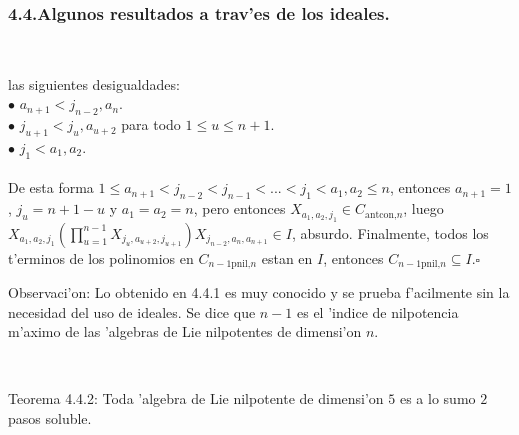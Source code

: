 \documentclass[10pt]{beamer}
\begin{document}
\begin{frame}
\frametitle{4.4.Algunos resultados a trav'es de los ideales.}\\
\begin{block}{}
las siguientes desigualdades:\\
$\bullet$ $a_{n+1}<j_{n-2},a_{n}$.\\
$\bullet$ $j_{u+1}<j_u,a_{u+2}$ para todo $1 \leq u \leq n+1$.\\
$\bullet$ $j_1 < a_1,a_2$.\\
\\
De esta forma $1 \leq a_{n+1} < j_{n-2} < j_{n-1} < ... < j_1 < a_1,a_2 \leq n$, entonces $a_{n+1}=1$, $j_u=n+1-u$ y $a_1=a_2=n$, pero entonces $X_{a_1,a_2,j_1} \in C_{\text{antcon,}n}$, luego $X_{a_1,a_2,j_1}\left ( \prod_{u=1}^{n-1}{X_{j_{u},a_{u+2},j_{u+1}}}\right )X_{j_{n-2},a_{n},a_{n+1}} \in I$, absurdo. Finalmente, todos los t'erminos de los polinomios en $C_{n-1\text{pnil,}n}$ estan en $I$, entonces $C_{n-1{\text{pnil,}n}} \subseteq I$.\hfill $\square$\\
\end{block}
\begin{block}{Observaci'on:}
Lo obtenido en 4.4.1 es muy conocido  y se prueba f'acilmente sin la necesidad del uso de ideales. Se dice que $n-1$ es el 'indice de nilpotencia m'aximo de las 'algebras de Lie nilpotentes de dimensi'on $n$.\\
\end{block}
\\
\begin{block}{Teorema 4.4.2:}
Toda 'algebra de Lie nilpotente de dimensi'on $5$ es a lo sumo $2$ pasos soluble.\\ 
\end{block}
\end{frame}
\end{document}
